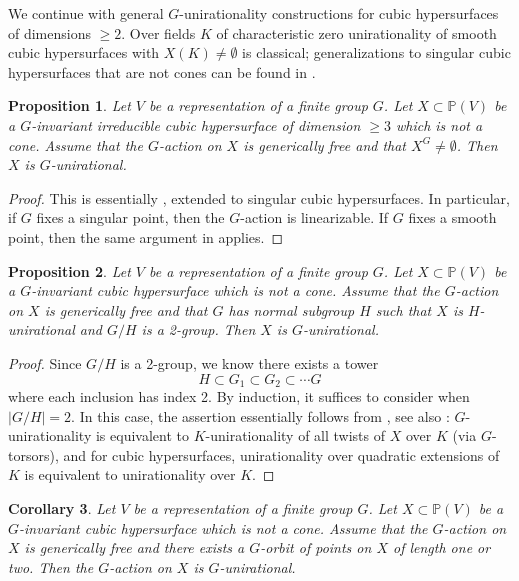 \documentclass[12pt,reqno]{amsart}
\theoremstyle{plain}
\newtheorem{prop}{Proposition}[section]
\newtheorem{coro}[prop]{Corollary}
\theoremstyle{remark}
\theoremstyle{definition}
\numberwithin{equation}{section}
\def\bP{{\mathbb P}}
\begin{document}
We continue with general $G$-unirationality constructions for cubic hypersurfaces of dimensions $\ge 2$. Over fields $K$ of characteristic zero unirationality of smooth cubic hypersurfaces with $X(K)\neq \emptyset$ is classical; generalizations to singular cubic hypersurfaces that are not cones can be found in \cite{kollarcubic}.   


\begin{prop}
    \label{prop:ind-1}
Let $V$ be a representation of a finite group $G$. 
    Let $X\subset \bP(V)$ be a $G$-invariant irreducible cubic hypersurface of dimension $\geq 3$ which is not a cone. Assume that 
    the $G$-action on $X$ is generically free and that $X^G\neq \emptyset$. Then $X$ is $G$-unirational.
\end{prop}

\begin{proof}
This is essentially \cite[Corollary 10.6]{DR}, extended to singular cubic hypersurfaces. In particular, if $G$ fixes a singular point, then the $G$-action is linearizable. If $G$ fixes a smooth point, then the same argument in \cite[Corollary 10.6]{DR} applies.
\end{proof}



\begin{prop}
    \label{prop:ind-2}
Let $V$ be a representation of a finite group $G$. 
    Let $X\subset \bP(V)$ be a $G$-invariant cubic hypersurface which is not a cone. Assume that 
    the $G$-action on $X$ is generically free 
   and that $G$ has normal subgroup $H$ such that $X$ is $H$-unirational and $G/H$ is a 2-group. Then $X$ is $G$-unirational.
\end{prop}

\begin{proof}
Since $G/H$ is a 2-group, we know there exists a tower 
$$
H\subset G_1\subset G_2\subset\cdots G
$$
where each inclusion has index 2.  By induction, it suffices to consider when $|G/H|=2$. In this case, the assertion essentially follows from \cite[Theorem 3.2]{Duncan}, see also \cite[Remark 3.3]{Duncan}: $G$-unirationality is equivalent to $K$-unirationality of all twists of $X$ over $K$ (via $G$-torsors), and for cubic hypersurfaces, unirationality over quadratic extensions of $K$ is equivalent to unirationality over $K$.     
\end{proof}



\begin{coro}\label{coro:2sing}
Let $V$ be a representation of a finite group $G$. 
Let $X\subset \bP(V)$ be a $G$-invariant cubic hypersurface which is not a cone. Assume that 
    the $G$-action on $X$ is generically free 
   and there exists a $G$-orbit of points on $X$ of length one or two. 
Then the $G$-action on $X$ is $G$-unirational.    
\end{coro}
\end{document}
